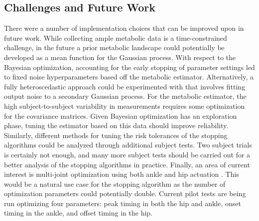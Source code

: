 \subsection*{Challenges and Future Work}
There were a number of implementation choices that can be improved upon in future work. While collecting ample metabolic data is a time-constrained challenge, in the future a prior metabolic landscape could potentially be developed as a mean function for the Gaussian process. With respect to the Bayesian optimization, accounting for the early stopping of parameter settings led to fixed noise hyperparameters based off the metabolic estimator. Alternatively, a fully heteroscedastic approach could be experimented with that involves fitting output noise to a secondary Gaussian process. For the metabolic estimator, the high subject-to-subject variability in measurements requires some optimization for the covariance matrices. Given Bayesian optimization has an exploration phase, tuning the estimator based on this data should improve reliability. Similarly, different methods for tuning the risk tolerances of the stopping algorithms could be analyzed through additional subject tests. Two subject trials is certainly not enough, and many more subject tests should be carried out for a better analysis of the stopping algorithms in practice. Finally, an area of current interest is multi-joint optimization using both ankle and hip actuation \citep{1298569}. This would be a natural use case for the stopping algorithm as the number of optimization parameters could potentially double. Current pilot tests are being run optimizing four parameters: peak timing in both the hip and ankle, onset timing in the ankle, and offset timing in the hip.